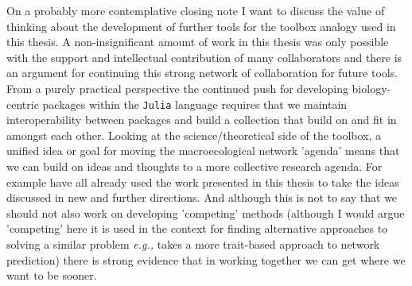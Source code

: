 On a probably more contemplative closing note I want to discuss the value of thinking about the development of further tools for the toolbox analogy used in this thesis. A non-insignificant amount of work in this thesis was only possible with the support and intellectual contribution of many collaborators and there is an argument for continuing this strong network of collaboration for future tools. From a purely practical perspective the continued push for developing biology-centric packages within the \texttt{Julia} language \cite{Roesch2021Julia} requires that we maintain interoperability between packages and build a collection that build on and fit in amongst each other. Looking at the science/theoretical side of the toolbox, a unified idea or goal for moving the macroecological network 'agenda' means that we can build on ideas and thoughts to a more collective research agenda. For example \cite{Dansereau2023Spatially, Catchen2023Improving, Banville2023What} have all already used the work presented in this thesis to take the ideas discussed in new and further directions. And although this is not to say that we should not also work on developing 'competing' methods (although I would argue 'competing' here it is used in the context for finding alternative approaches to solving a similar problem \emph{e.g.,} \cite{Caron2022Addressing} takes a more trait-based approach to network prediction) there is strong evidence that in working together we can get where we want to be sooner. 



\endinput